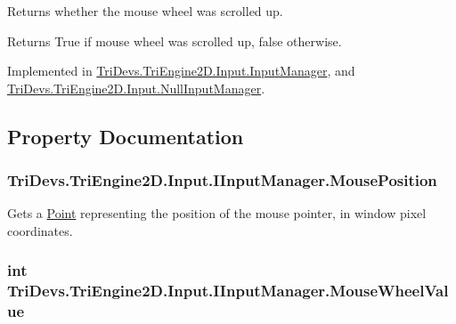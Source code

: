 Returns whether the mouse wheel was scrolled up. 

\begin{DoxyReturn}{Returns}
True if mouse wheel was scrolled up, false otherwise.
\end{DoxyReturn}


Implemented in \hyperlink{class_tri_devs_1_1_tri_engine2_d_1_1_input_1_1_input_manager_a5f8ea7daefda14c2dfa098dc1274e59c}{Tri\-Devs.\-Tri\-Engine2\-D.\-Input.\-Input\-Manager}, and \hyperlink{class_tri_devs_1_1_tri_engine2_d_1_1_input_1_1_null_input_manager_a6ffebd26487cf6673e9b71808bfd2e56}{Tri\-Devs.\-Tri\-Engine2\-D.\-Input.\-Null\-Input\-Manager}.



\subsection{Property Documentation}
\hypertarget{interface_tri_devs_1_1_tri_engine2_d_1_1_input_1_1_i_input_manager_a59ffc200aff9e1b5c2830dbc7492152a}{
\subsubsection[{Mouse\-Position}]{ Tri\-Devs.\-Tri\-Engine2\-D.\-Input.\-I\-Input\-Manager.\-Mouse\-Position\hspace{0.3cm}{\ttfamily [get]}}}\label{interface_tri_devs_1_1_tri_engine2_d_1_1_input_1_1_i_input_manager_a59ffc200aff9e1b5c2830dbc7492152a}


Gets a \hyperlink{struct_tri_devs_1_1_tri_engine2_d_1_1_point}{Point} representing the position of the mouse pointer, in window pixel coordinates. 

\hypertarget{interface_tri_devs_1_1_tri_engine2_d_1_1_input_1_1_i_input_manager_a7d42befc637abbaf51f46ba93d12aff8}{
\subsubsection[{Mouse\-Wheel\-Value}]{\setlength{\rightskip}{0pt plus 5cm}int Tri\-Devs.\-Tri\-Engine2\-D.\-Input.\-I\-Input\-Manager.\-Mouse\-Wheel\-Value\hspace{0.3cm}{\ttfamily [get]}}}\label{interface_tri_devs_1_1_tri_engine2_d_1_1_input_1_1_i_input_manager_a7d42befc637abbaf51f46ba93d12aff8}


